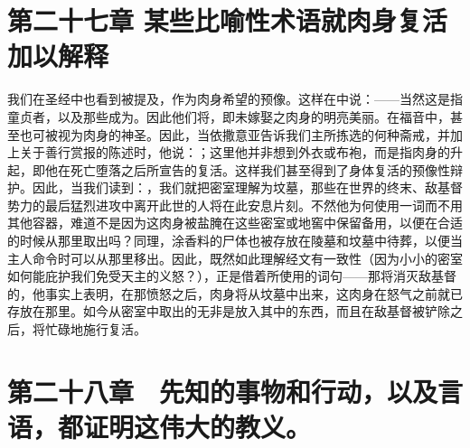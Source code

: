 
\section{第二十七章 某些比喻性术语就肉身复活加以解释}

我们在圣经中也看到被提及，作为肉身希望的预像。这样在中说：——当然这是指童贞者，以及那些成为。因此他们将，即未嫁娶之肉身的明亮美丽。在福音中，甚至也可被视为肉身的神圣。因此，当依撒意亚告诉我们主所拣选的何种斋戒，并加上关于善行赏报的陈述时，他说：；这里他并非想到外衣或布袍，而是指肉身的升起，即他在死亡堕落之后所宣告的复活。这样我们甚至得到了身体复活的预像性辩护。因此，当我们读到：，我们就把密室理解为坟墓，那些在世界的终末、敌基督势力的最后猛烈进攻中离开此世的人将在此安息片刻。不然他为何使用一词而不用其他容器，难道不是因为这肉身被盐腌在这些密室或地窖中保留备用，以便在合适的时候从那里取出吗？同理，涂香料的尸体也被存放在陵墓和坟墓中待葬，以便当主人命令时可以从那里移出。因此，既然如此理解经文有一致性（因为小小的密室如何能庇护我们免受天主的义怒？），正是借着所使用的词句——那将消灭敌基督的，他事实上表明，在那愤怒之后，肉身将从坟墓中出来，这肉身在怒气之前就已存放在那里。如今从密室中取出的无非是放入其中的东西，而且在敌基督被铲除之后，将忙碌地施行复活。\par


\section{第二十八章　先知的事物和行动，以及言语，都证明这伟大的教义。}

